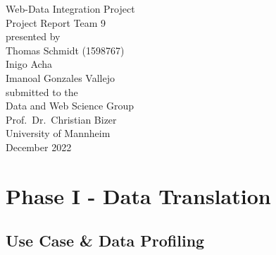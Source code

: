 \documentclass[11pt,titlepage,oneside,openany]{article}
\begin{document}
\begin{titlepage}
	\vspace*{2cm}
  \begin{center}
   {\Large Web-Data Integration Project\\}
   \vspace{2cm} 
   {Project Report Team 9\\}
   \vspace{2cm}
   {presented by\\
    Thomas Schmidt (1598767) \\
    Inigo Acha\\
    Imanoal Gonzales Vallejo\\
   }
   \vspace{1cm} 
   {submitted to the\\
    Data and Web Science Group\\
    Prof.\ Dr.\ Christian Bizer\\
    University of Mannheim\\} \vspace{2cm}
   {December 2022}
  \end{center}
\end{titlepage} 

\newpage



\newpage



\section{Phase I - Data Translation}
\label{cha:data-translation}

 

\subsection{Use Case \& Data Profiling}
\end{document}

